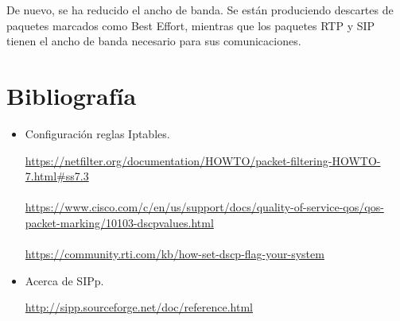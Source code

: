 \documentclass[11pt]{article}
\begin{document}
De nuevo, se ha reducido el ancho de banda. Se están produciendo descartes de paquetes marcados como Best Effort, mientras que los paquetes RTP y SIP tienen el ancho de banda necesario para sus comunicaciones.
\section{Bibliografía}

\begin{itemize}
	\item Configuración reglas Iptables.

	\url{https://netfilter.org/documentation/HOWTO/packet-filtering-HOWTO-7.html#ss7.3}\\ \\
	\url{https://www.cisco.com/c/en/us/support/docs/quality-of-service-qos/qos-packet-marking/10103-dscpvalues.html}\\ \\
	\url{https://community.rti.com/kb/how-set-dscp-flag-your-system}
	
	\item Acerca de SIPp.
	
	\url{http://sipp.sourceforge.net/doc/reference.html}
\end{itemize}
\end{document}
